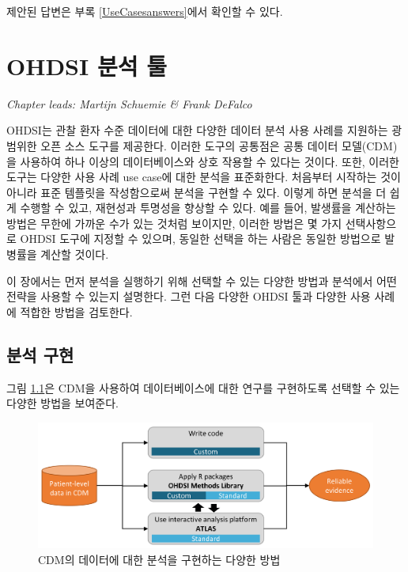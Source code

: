 \documentclass[11pt]{book}
\theoremstyle{definition}
\theoremstyle{definition}
\theoremstyle{definition}
\theoremstyle{remark}
\begin{document}
제안된 답변은 부록 \ref{UseCasesanswers}에서 확인할 수 있다.

\chapter{OHDSI 분석 툴}\label{OhdsiAnalyticsTools}

\emph{Chapter leads: Martijn Schuemie \& Frank DeFalco}

OHDSI는 관찰 환자 수준 데이터에 대한 다양한 데이터 분석 사용 사례를
지원하는 광범위한 오픈 소스 도구를 제공한다. 이러한 도구의 공통점은 공통
데이터 모델(CDM)을 사용하여 하나 이상의 데이터베이스와 상호 작용할 수
있다는 것이다. 또한, 이러한 도구는 다양한 사용 사례 use case에 대한
분석을 표준화한다. 처음부터 시작하는 것이 아니라 표준 템플릿을
작성함으로써 분석을 구현할 수 있다. 이렇게 하면 분석을 더 쉽게 수행할 수
있고, 재현성과 투명성을 향상할 수 있다. 예를 들어, 발생률을 계산하는
방법은 무한에 가까운 수가 있는 것처럼 보이지만, 이러한 방법은 몇 가지
선택사항으로 OHDSI 도구에 지정할 수 있으며, 동일한 선택을 하는 사람은
동일한 방법으로 발병률을 계산할 것이다.

이 장에서는 먼저 분석을 실행하기 위해 선택할 수 있는 다양한 방법과
분석에서 어떤 전략을 사용할 수 있는지 설명한다. 그런 다음 다양한 OHDSI
툴과 다양한 사용 사례에 적합한 방법을 검토한다.

\section{분석 구현}\label{analysisImplementation}

그림 \ref{fig:implementations}은 CDM을 사용하여 데이터베이스에 대한
연구를 구현하도록 선택할 수 있는 다양한 방법을 보여준다.

\begin{figure}

{\centering \includegraphics[width=0.9\linewidth]{images/OhdsiAnalyticsTools/implementations} 

}

\caption{CDM의 데이터에 대한 분석을 구현하는 다양한 방법}\label{fig:implementations}
\end{figure}
\end{document}
